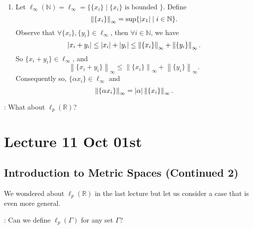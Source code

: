 \documentclass[notoc,notitlepage]{tufte-book}
\newcommand{\norm}[1]{\left\| #1 \right\|}
\begin{document}
\begin{eg}
\begin{enumerate}
    \item Let $\ell_\infty(\mathbb{N}) = \ell_\infty = \{ \{ x_i \} \mid \{ x_i \} \text{ is bounded } \}$. Define
      \begin{equation*}
        \norm{ \{ x_i \} }_\infty = \sup \{ \abs{ x_1 } \mid i \in \mathbb{N} \}.
      \end{equation*}
      Observe that $\forall \{ x_i \}, \{ y_i \} \in \ell_\infty$, then $\forall i \in \mathbb{N}$, we have
      \begin{equation*}
        \abs{x_i + y_i} \leq \abs{ x_i } + \abs{ y_i } \leq \norm{\{x_i\}}_\infty + \norm{\{y_i\}}_\infty.
      \end{equation*}
      So $\{ x_i + y_i \} \in \ell_\infty$, and
      \begin{equation*}
        \norm{ \{ x_i + y_i \} }_\infty \leq \norm{ \{ x_i\} }_\infty + \norm{ \{ y_i \} }_\infty.
      \end{equation*}
      Consequently so, $\{ \alpha x_i \} \in \ell_\infty$ and
      \begin{equation*}
        \norm{ \{ \alpha x_i \} }_\infty = \abs{ \alpha } \norm{ \{ x_i \} }_\infty.
      \end{equation*}
  \end{enumerate}
\end{eg}

: What about $\ell_p(\mathbb{R})$?



\chapter{Lecture 11 Oct 01st}%
\label{chp:lecture_11_oct_01st}

\section{Introduction to Metric Spaces (Continued 2)}%
\label{sec:introduction_to_metric_spaces_continued_2}

We wondered about $\ell_p(\mathbb{R})$ in the last lecture but let us consider a case that is even more general.

: Can we define $\ell_p(\Gamma)$ for any set $\Gamma$?
\end{document}
